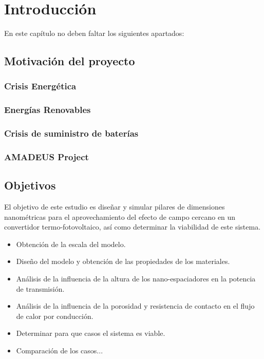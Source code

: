 \chapter{Introducción}

En este capítulo no deben faltar los siguientes apartados:

\section{Motivación del proyecto}

\subsection{Crisis Energética}

\subsection{Energías Renovables}

\subsection{Crisis de suministro de baterías}

\subsection{AMADEUS Project}


\section{Objetivos}
El objetivo de este estudio es diseñar y simular pilares de dimensiones nanométricas para el aprovechamiento del efecto de campo cercano en un convertidor termo-fotovoltaico, así como determinar la viabilidad de este sistema. 
\begin{itemize}
	\item Obtención de la escala del modelo.
	\item Diseño del modelo y obtención de las propiedades de los materiales.
	\item Análisis de la influencia de la altura de los nano-espaciadores en la potencia de transmisión.
	\item Análisis de la influencia de la porosidad y resistencia de contacto en el flujo de calor por conducción.
	\item Determinar para que casos el sistema es viable. 
	\item Comparación de los casos...
\end{itemize}


